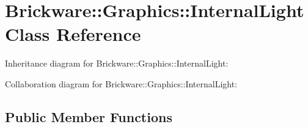 \hypertarget{classBrickware_1_1Graphics_1_1InternalLight}{}\section{Brickware\+:\+:Graphics\+:\+:Internal\+Light Class Reference}
\label{classBrickware_1_1Graphics_1_1InternalLight}


Inheritance diagram for Brickware\+:\+:Graphics\+:\+:Internal\+Light\+:


Collaboration diagram for Brickware\+:\+:Graphics\+:\+:Internal\+Light\+:
\subsection*{Public Member Functions}
